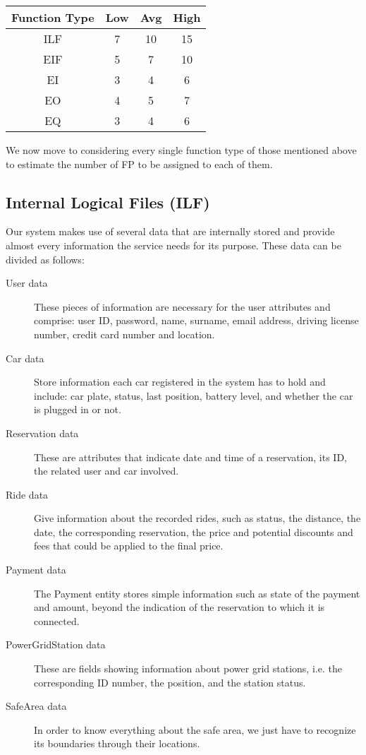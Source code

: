 \begin{center}
\begin{tabular}{ | c | c | c | c | }
\hline
	\textbf{Function Type} & \textbf{Low} & \textbf{Avg} & \textbf{High} \\ \hline\hline
	ILF & 7 & 10 & 15  \\ \hline
	EIF & 5 & 7 & 10  \\ \hline
	EI & 3 & 4 & 6  \\ \hline
	EO & 4 & 5 & 7  \\ \hline
	EQ & 3 & 4 & 6  \\ \hline
\end{tabular}
\end{center}

We now move to considering every single function type of those mentioned above to estimate the number of FP to be assigned to each of them.

\subsection{Internal Logical Files (ILF)}

Our system makes use of several data that are internally stored and provide almost every information the service needs for its purpose. These data can be divided as follows:

\begin{description}
\item[User data] These pieces of information are necessary for the user attributes and comprise: user ID, password, name, surname, email address, driving license number, credit card number and location.
\item[Car data] Store information each car registered in the system has to hold and include: car plate, status, last position, battery level, and whether the car is plugged in or not.
\item[Reservation data] These are attributes that indicate date and time of a reservation, its ID, the related user and car involved.
\item[Ride data] Give information about the recorded rides, such as status, the distance, the date, the corresponding reservation, the price and potential discounts and fees that could be applied to the final price.
\item[Payment data] The Payment entity stores simple information such as state of the payment and amount, beyond the indication of the reservation to which it is connected.
\item[PowerGridStation data] These are fields showing information about power grid stations, i.e. the corresponding ID number, the position, and the station status.
\item[SafeArea data] In order to know everything about the safe area, we just have to recognize its boundaries through their locations.
\end{description}

